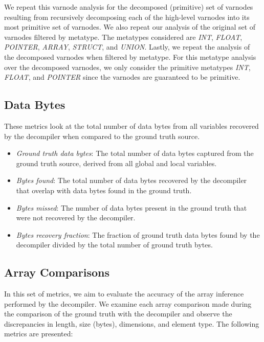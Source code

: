 We repeat this varnode analysis for the decomposed (primitive) set of varnodes resulting from recursively decomposing each of the high-level varnodes into its most primitive set of varnodes. We also repeat our analysis of the original set of varnodes filtered by metatype. The metatypes considered are \emph{INT}, \emph{FLOAT}, \emph{POINTER}, \emph{ARRAY}, \emph{STRUCT}, and \emph{UNION}. Lastly, we repeat the analysis of the decomposed varnodes when filtered by metatype. For this metatype analysis over the decomposed varnodes, we only consider the primitive metatypes \emph{INT}, \emph{FLOAT}, and \emph{POINTER} since the varnodes are guaranteed to be primitive.

\subsection{Data Bytes}

These metrics look at the total number of data bytes from all variables recovered by the decompiler when compared to the ground truth source.

\begin{itemize}
    \item \emph{Ground truth data bytes}: The total number of data bytes captured from the ground truth source, derived from all global and local variables.
    \item \emph{Bytes found}: The total number of data bytes recovered by the decompiler that overlap with data bytes found in the ground truth.
    \item \emph{Bytes missed}: The number of data bytes present in the ground truth that were not recovered by the decompiler.
    \item \emph{Bytes recovery fraction}: The fraction of ground truth data bytes found by the decompiler divided by the total number of ground truth bytes.
\end{itemize}

\subsection{Array Comparisons}

In this set of metrics, we aim to evaluate the accuracy of the array inference performed by the decompiler. We examine each array comparison made during the comparison of the ground truth with the decompiler and observe the discrepancies in length, size (bytes), dimensions, and element type. The following metrics are presented:

